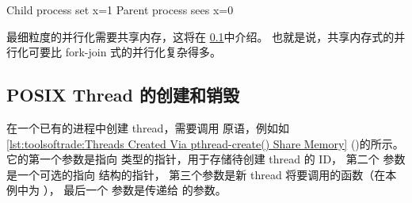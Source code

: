\begin{VerbatimU}
Child process set x=1
Parent process sees x=0
\end{VerbatimU}

\QuickQuizEnd

最细粒度的并行化需要共享内存，这将在
\cref{sec:toolsoftrade:POSIX Thread Creation and Destruction}中介绍。
也就是说，共享内存式的并行化可要比 fork-join 式的并行化复杂得多。

\subsection{POSIX Thread 的创建和销毁}
\label{sec:toolsoftrade:POSIX Thread Creation and Destruction}

\begin{fcvref}
在一个已有的进程中创建 thread，需要调用
 原语，例如如
\cref{lst:toolsoftrade:Threads Created Via pthread-create() Share Memory}
()的所示。
它的第一个参数是指向  类型的指针，用于存储待创建 thread 的 ID，
第二个  参数是一个可选的指向  结构的指针，
第三个参数是新 thread 将要调用的函数（在本例中为 ），
最后一个  参数是传递给  的参数。
\end{fcvref}

\begin{listing}

\caption{通过  创建的 Thread 共享内存}
\label{lst:toolsoftrade:Threads Created Via pthread-create() Share Memory}
\end{listing}

